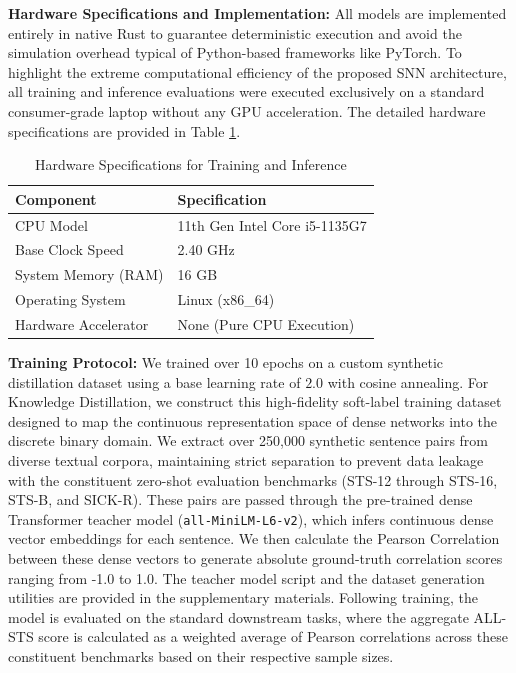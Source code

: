 \documentclass[10pt]{article} %
\begin{document}
\textbf{Hardware Specifications and Implementation:} All models are implemented entirely in native Rust to guarantee deterministic execution and avoid the simulation overhead typical of Python-based frameworks like PyTorch. To highlight the extreme computational efficiency of the proposed SNN architecture, all training and inference evaluations were executed exclusively on a standard consumer-grade laptop without any GPU acceleration. The detailed hardware specifications are provided in Table \ref{tab:hardware_specs}.

\begin{table}[ht]
\centering
\caption{Hardware Specifications for Training and Inference}
\begin{tabular}{ll}
\toprule
\textbf{Component} & \textbf{Specification} \\
\midrule
CPU Model & 11th Gen Intel Core i5-1135G7 \\
Base Clock Speed & 2.40 GHz \\
System Memory (RAM) & 16 GB \\
Operating System & Linux (x86\_64) \\
Hardware Accelerator & None (Pure CPU Execution) \\
\bottomrule
\end{tabular}
\label{tab:hardware_specs}
\end{table}

\textbf{Training Protocol:} We trained over 10 epochs on a custom synthetic distillation dataset using a base learning rate of $2.0$ with cosine annealing. For Knowledge Distillation, we construct this high-fidelity soft-label training dataset designed to map the continuous representation space of dense networks into the discrete binary domain. We extract over 250,000 synthetic sentence pairs from diverse textual corpora, maintaining strict separation to prevent data leakage with the constituent zero-shot evaluation benchmarks (STS-12 through STS-16, STS-B, and SICK-R). These pairs are passed through the pre-trained dense Transformer teacher model (\texttt{all-MiniLM-L6-v2}), which infers continuous dense vector embeddings for each sentence. We then calculate the Pearson Correlation between these dense vectors to generate absolute ground-truth correlation scores ranging from -1.0 to 1.0. The teacher model script and the dataset generation utilities are provided in the supplementary materials. Following training, the model is evaluated on the standard downstream tasks, where the aggregate ALL-STS score is calculated as a weighted average of Pearson correlations across these constituent benchmarks based on their respective sample sizes.
\end{document}
